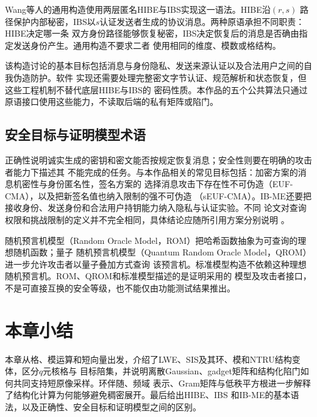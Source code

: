 Wang等人的通用构造使用两层匿名HIBE与IBS实现这一语法\cite{wang2024ibme}。HIBE沿$(r,s)$
路径保护内部秘密，IBS以$s$认证发送者生成的协议消息。两种原语承担不同职责：HIBE决定哪一条
双方身份路径能够恢复秘密，IBS决定恢复后的消息是否确由指定发送身份产生。通用构造不要求二者
使用相同的维度、模数或格结构。

该构造讨论的基本目标包括消息与身份隐私、发送来源认证以及合法用户之间的自我伪造防护。软件
实现还需要处理完整密文字节认证、规范解析和状态恢复，但这些工程机制不替代底层HIBE与IBS的
密码性质。本作品的五个公共算法只通过原语接口使用这些能力，不读取后端的私有矩阵或陷门。

\subsection{安全目标与证明模型术语}

正确性说明诚实生成的密钥和密文能否按规定恢复消息；安全性则要在明确的攻击者能力下描述其
不能完成的任务。与本作品相关的常见目标包括：加密方案的消息机密性与身份匿名性，签名方案的
选择消息攻击下存在性不可伪造（EUF-CMA），以及把新签名值也纳入限制的强不可伪造
（sEUF-CMA）。IB-ME还要把接收身份、发送身份和合法用户持钥能力纳入隐私与认证实验。不同
论文对查询权限和挑战限制的定义并不完全相同，具体结论应随所引用方案分别说明
\cite{wang2024ibme,sageloli2023ibs}。

随机预言机模型（Random Oracle Model，ROM）把哈希函数抽象为可查询的理想随机函数；量子
随机预言机模型（Quantum Random Oracle Model，QROM）进一步允许攻击者以量子叠加方式查询
该预言机。标准模型构造不依赖这种理想随机预言机。ROM、QROM和标准模型描述的是证明采用的
模型及攻击者接口，不是可直接互换的安全等级，也不能仅由功能测试结果推出。

\section{本章小结}

本章从格、模运算和短向量出发，介绍了LWE、SIS及其环、模和NTRU结构变体，区分$q$元核格与
目标陪集，并说明离散Gaussian、gadget矩阵和结构化陷门如何共同支持短原像采样。环伴随、频域
表示、Gram矩阵与低秩平方根进一步解释了结构化计算为何能够避免稠密展开。最后给出HIBE、IBS
和IB-ME的基本语法，以及正确性、安全目标和证明模型之间的区别。
